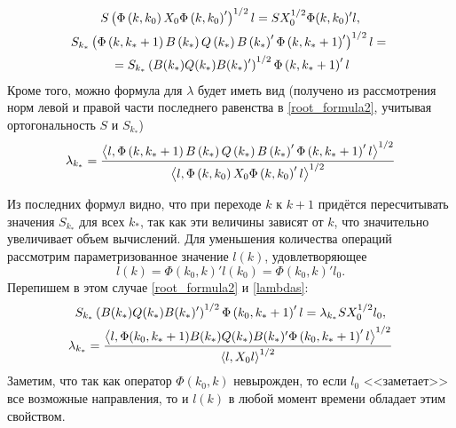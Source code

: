 \documentclass[10pt, a4paper]{article}
\begin{document}
\begin{gather}
	\label{root_formula1} S\left(\Phi\left(k,k_0\right)X_0\Phi\left(k,k_0\right)'\right)^{1/2}l =
		SX_0^{1/2}\Phi(k,k_0)'l, \\ 
		\notag  S_{k_*}\left(\Phi\left(k,k_*+1\right)B\left(k_*\right)Q\left(k_*\right)B\left(k_*\right)'\Phi\left(k,k_*+1\right)'\right)^{1/2}l 
		= {}\\   \label{root_formula2} {} = S_{k_*}\left(B(k_*)Q(k_*)B(k_*)'\right)^{1/2}\Phi\left(k,k_*+1\right)'l
\end{gather}
Кроме того, можно формула для $\lambda$ будет иметь вид (получено из рассмотрения норм левой и правой части последнего равенства в \eqref{root_formula2}, учитывая ортогональность $S$ и $S_{k_*}$)
\begin{equation}\label{lambdas}
	\lambda_{k_*} = \frac {\left<l,\Phi\left(k,k_*+1\right)B\left(k_*\right)Q\left(k_*\right)B\left(k_*\right)'\Phi\left(k,k_*+1\right)'l\right>^{1/2}}{\left<l,\Phi\left(k,k_0\right)X_0\Phi\left(k,k_0\right)'l\right>^{1/2}}
\end{equation}
\begin{note}
Из последних формул видно, что при переходе $k$ к $k+1$ придётся пересчитывать значения $S_{k_*}$ для всех $k_*$, так как эти величины зависят от $k$, что значительно увеличивает объем вычислений. Для уменьшения количества операций рассмотрим параметризованное значение $l(k)$, удовлетворяющее 
	\begin{equation}\label{newl}
		l(k)=\Phi(k_0,k)'l(k_0) = \Phi(k_0,k)'l_0.
	\end{equation}
	Перепишем в этом случае \eqref{root_formula2} и \eqref{lambdas}:
	\begin{gather}\label{new_lambdas}
		S_{k_*}\left(B(k_*)Q(k_*)B(k_*)'\right)^{1/2}\Phi\left(k_0,k_*+1\right)'l = \lambda_{k_*}SX_0^{1/2}l_0, \\
		\lambda_{k_*} =
			 \frac{\left<l,\Phi(k_0,k_*+1)B(k_*)Q(k_*)B(k_*)'\Phi\left(k_0,k_*+1\right)'l\right>^{1/2} }
			{\left<l,X_0l\right>^{1/2} }
	\end{gather}	
	Заметим, что так как оператор $\Phi(k_0,k)$ невырожден, то если $l_0$ <<заметает>>  все возможные направления, то и $l(k)$ в любой момент времени обладает этим свойством.
\end{note}
\end{document}

